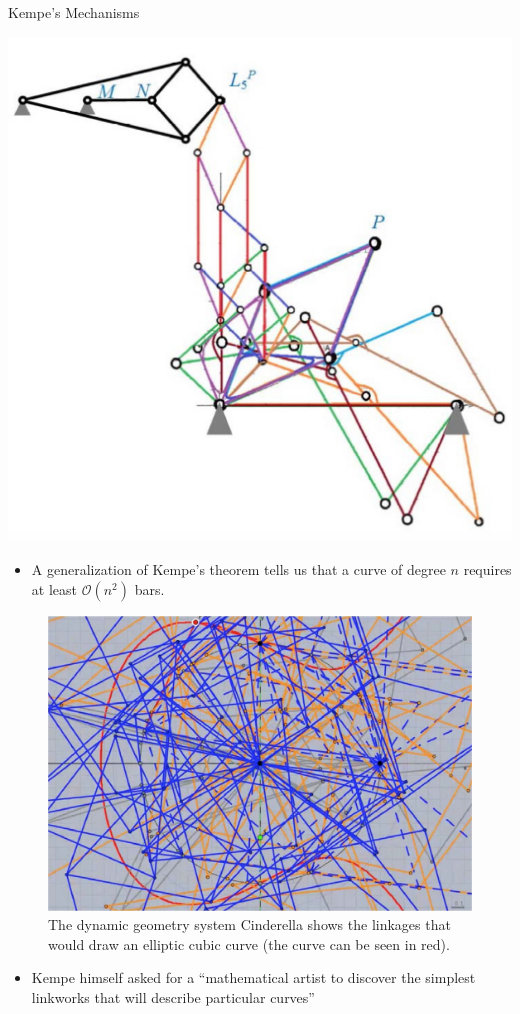 \documentclass{beamer}
\begin{document}
\begin{frame}{}
\begin{columns}[t]
\begin{column}{0.245\linewidth}
\begin{block}{Kempe's Mechanisms}
\begin{center}
	\includegraphics[width=0.5\columnwidth]{kempe_linkage}
\end{center}

\vspace{2em}

\begin{itemize}
\item A generalization of Kempe's theorem tells us that a curve of degree $n$ requires at least $\mathcal{O}(n^2)$ bars.
\end{itemize}

\begin{center}
	\begin{figure}
	\includegraphics[width=0.5\columnwidth]{quad-curve}
	\caption{The dynamic geometry system Cinderella shows the linkages that would draw an elliptic cubic curve (the curve can be seen in red).}
	\end{figure}
\end{center}

\vspace{2em}
\begin{itemize}
\item Kempe himself asked for a “mathematical artist to discover the simplest linkworks that will describe particular curves”
\end{itemize}

\end{block}


\end{column}
\end{columns}
\end{frame}
\end{document}
